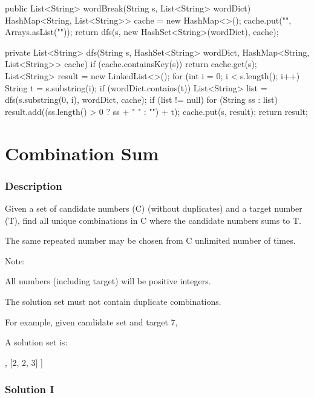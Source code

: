 \begin{Code}
public List<String> wordBreak(String s, List<String> wordDict) {
    HashMap<String, List<String>> cache = new HashMap<>();
    cache.put("", Arrays.asList(""));
    return dfs(s, new HashSet<String>(wordDict), cache);
}

private List<String> dfs(String s, HashSet<String> wordDict, HashMap<String, List<String>> cache) {
    if (cache.containsKey(s)) {
        return cache.get(s);
    }
    List<String> result = new LinkedList<>();
    for (int i = 0; i < s.length(); i++) {
        String t = s.substring(i);
        if (wordDict.contains(t)) {
            List<String> list = dfs(s.substring(0, i), wordDict, cache);
            if (list != null) {
                for (String ss : list) {
                    result.add((ss.length() > 0 ? ss + " " : "") + t);
                }
            }
        }
    }
    cache.put(s, result);
    return result;
}
\end{Code}

\newpage

\section{Combination Sum}
\subsubsection{Description}
Given a set of candidate numbers (C) (without duplicates) and a target number (T), find all unique combinations in C where the candidate numbers sums to T.

The same repeated number may be chosen from C unlimited number of times.

Note:

All numbers (including target) will be positive integers.

The solution set must not contain duplicate combinations.

For example, given candidate set \code{[2, 3, 6, 7]} and target 7,

A solution set is:
\begin{code}
[
  [7],
  [2, 2, 3]
]
\end{code}

\subsubsection{Solution I}

